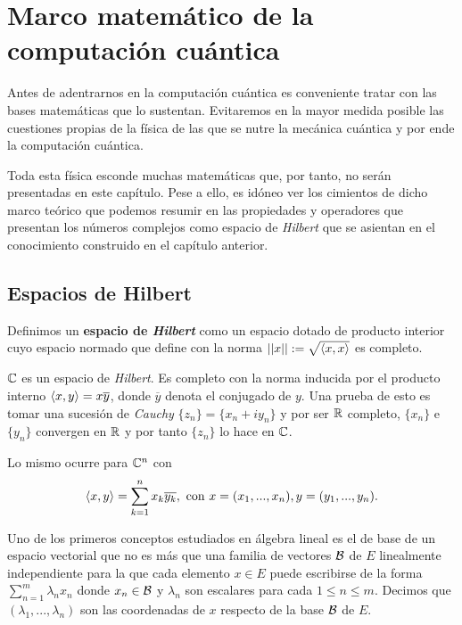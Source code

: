 \chapter{Marco matemático de la computación cuántica}

Antes de adentrarnos en la computación cuántica es conveniente tratar con las bases matemáticas que lo sustentan. Evitaremos en la mayor medida posible las cuestiones propias de la física de las que se nutre la mecánica cuántica y por ende la computación cuántica.

Toda esta física esconde muchas matemáticas que, por tanto, no serán presentadas en este capítulo. Pese a ello, es idóneo ver los cimientos de dicho marco teórico que podemos resumir en las propiedades y operadores que presentan los números complejos como espacio de \textit{Hilbert} que se asientan en el conocimiento construido en el capítulo anterior.

\section{Espacios de Hilbert}
\begin{definition} Definimos un \textbf{espacio de \textit{Hilbert}} como un espacio dotado de producto interior cuyo espacio normado que define con la norma $\left|\left|x\right|\right|:=\sqrt{\langle x,x\rangle}$ es completo.
\end{definition}

\begin{example} $\mathbb{C}$ es un espacio de \textit{Hilbert}. Es completo con la norma inducida por el producto interno $\langle x,y\rangle=x\overline{y}$, donde $\overline{y}$ denota el conjugado de $y$. Una prueba de esto es tomar una sucesión de \textit{Cauchy} $\{z_n\}=\{x_n+iy_n\}$ y por ser $\mathbb{R}$ completo, $\{x_n\}$ e $\{y_n\}$ convergen en $\mathbb{R}$ y por tanto $\{z_n\}$ lo hace en $\mathbb{C}$.

Lo mismo ocurre para $\mathbb{C}^n$ con
\begin{equation}\dotproduct{x}{y}=\sum^{n}_{k=1}x_k\overline{y_k},\mathrm{\ con\ } x=(x_1,...,x_n), y=(y_1,...,y_n).
\end{equation}
\end{example}

Uno de los primeros conceptos estudiados en álgebra lineal es el de base de un espacio vectorial que no es más que una familia de vectores $\mathcal{B}$ de $E$ linealmente independiente para la que cada elemento $x\in E$ puede escribirse de la forma $\sum_{n=1}^m\lambda_nx_n$ donde $x_n\in\mathcal{B}$ y $\lambda_n$ son escalares para cada $1\leq n\leq m$. Decimos que $(\lambda_1,...,\lambda_n)$ son las coordenadas de $x$ respecto de la base $\mathcal{B}$ de $E$.

